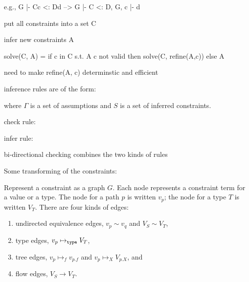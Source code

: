 \documentclass[preprint,nocopyrightspace,9pt]{sigplanconf}
\begin{document}
        e.g., G |- C{c} <: D{d}
        -->
        G |- C <: D,
        G, c |- d

        put all constraints into a set C

        infer new constraints A

        solve(C, A) =
                  if c in C s.t. A c not valid
                  then
                        solve(C, refine(A,c))
                  else
                        A

        need to make refine(A, c) determinstic and efficient





inference rules are of the form:


where $\Gamma$ is a set of assumptions and $S$ is a set of inferred
constraints.

check rule:


infer rule:


bi-directional checking combines the two kinds of rules


Some transforming of the constraints:






\newcommand\eqedge{\sim}
\newcommand\flowedge{\to}
\newcommand\treeedge[1]{\mapsto_{#1}}
\newcommand\typeedge{\mapsto_{\tt type}}

Represent a constraint as a graph $G$.
Each node represents a constraint term for a value or a type.
The node for a path $p$ is written $v_p$;
the node for a type $T$ is written $V_T$.
There are four kinds of edges:
\begin{enumerate}
\item undirected equivalence edges,
        $v_p \eqedge v_q$ and $V_S \eqedge V_T$,
\item type edges, $v_p \typeedge V_T$,
\item tree edges, $v_p \treeedge{f} v_{p.f}$
              and $v_p \treeedge{X} V_{p.X}$, and
\item flow edges, $V_S \flowedge V_T$.
\end{enumerate}
\end{document}
